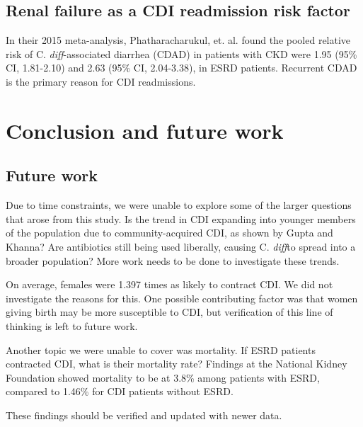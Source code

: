 \documentclass[12pt]{ociamthesis}\usepackage[]{graphicx}\usepackage[]{color}
\newcommand{\cdiff}{C. \textit{diff}}
\newcommand{\ci}[3]{#1 (95\% CI, #2-#3)}
\begin{document}
\section{Renal failure as a CDI readmission risk factor}

In their 2015 meta-analysis, Phatharacharukul, et. al. found the pooled relative risk of \cdiff-associated diarrhea (CDAD)
in patients with CKD were \ci{1.95}{1.81}{2.10} and \ci{2.63}{2.04}{3.38}, in ESRD patients. \cite{Phatharacharukul2015}
Recurrent CDAD is the primary reason for CDI readmissions.

\chapter{Conclusion and future work}



\section{Future work}

Due to time constraints, we were unable to explore some of the larger questions that arose
from this study. Is the trend in CDI expanding into younger members of the population due
to community-acquired CDI, as shown by Gupta and Khanna? \cite{Gupta2014} Are antibiotics
still being used liberally, causing \cdiff to spread into a broader population? More 
work needs to be done to investigate these trends.


On average, females were 1.397 times as likely to contract CDI. We did not investigate the
reasons for this. One possible contributing factor was that women giving birth may be more susceptible to CDI, but 
verification of this line of thinking is left to future work.

Another topic we were unable to cover was mortality. If ESRD patients contracted CDI, what is their mortality rate?
Findings at the National Kidney Foundation showed mortality to be at 3.8\% among patients with ESRD, compared to
1.46\% for CDI patients without ESRD. \cite{Susman2013} 

These findings should be verified and updated with newer data. 


% 
\renewcommand{\bibname}{References}
\printbibliography
\end{document}
